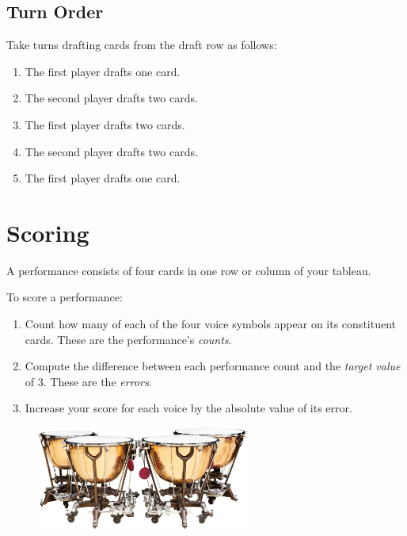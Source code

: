 \documentclass[a6paper, 12pt, parskip=half, DIV=14]{scrartcl}
\begin{document}
\subsection*{Turn Order}
Take turns drafting cards from the draft row as follows:
\begin{enumerate}[leftmargin=4ex]
\item The first player drafts one card.
\item The second player drafts two cards.
\item The first player drafts two cards.
\item The second player drafts two cards.
\item The first player drafts one card.
\end{enumerate}


\newpage
\enlargethispage{1.75\baselineskip}
\section*{Scoring}
A performance consists of four cards in one row or column of your tableau.

To score a performance:
\begin{enumerate}[leftmargin=4ex]
\item Count how many of each of the four voice symbols appear on its constituent cards. These are the performance's \emph{counts}.

\item Compute the difference between each performance count and the \emph{target value} of 3. These are the \emph{errors}.

\item Increase your score for each voice by the absolute value of its error.
\end{enumerate}

\vspace{0.5cm}

\begin{figure}[h]
\centering
\includegraphics[width=7cm]{Images/shutterstock_timpani.jpg}
\end{figure}

\newpage
\enlargethispage{1.75\baselineskip}
\end{document}
